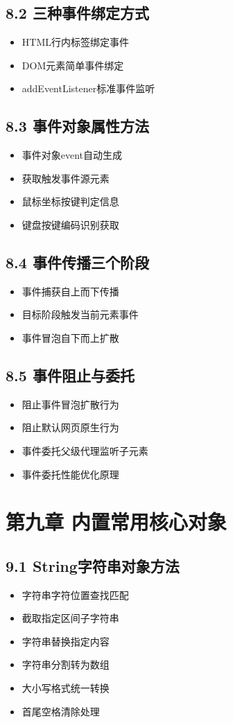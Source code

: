 \subsection{8.2 三种事件绑定方式}
\begin{itemize}
\item HTML行内标签绑定事件
\item DOM元素简单事件绑定
\item addEventListener标准事件监听
\end{itemize}

\subsection{8.3 事件对象属性方法}
\begin{itemize}
\item 事件对象event自动生成
\item 获取触发事件源元素
\item 鼠标坐标按键判定信息
\item 键盘按键编码识别获取
\end{itemize}

\subsection{8.4 事件传播三个阶段}
\begin{itemize}
\item 事件捕获自上而下传播
\item 目标阶段触发当前元素事件
\item 事件冒泡自下而上扩散
\end{itemize}

\subsection{8.5 事件阻止与委托}
\begin{itemize}
\item 阻止事件冒泡扩散行为
\item 阻止默认网页原生行为
\item 事件委托父级代理监听子元素
\item 事件委托性能优化原理
\end{itemize}

\section{第九章 内置常用核心对象}
\subsection{9.1 String字符串对象方法}
\begin{itemize}
\item 字符串字符位置查找匹配
\item 截取指定区间子字符串
\item 字符串替换指定内容
\item 字符串分割转为数组
\item 大小写格式统一转换
\item 首尾空格清除处理
\end{itemize}

